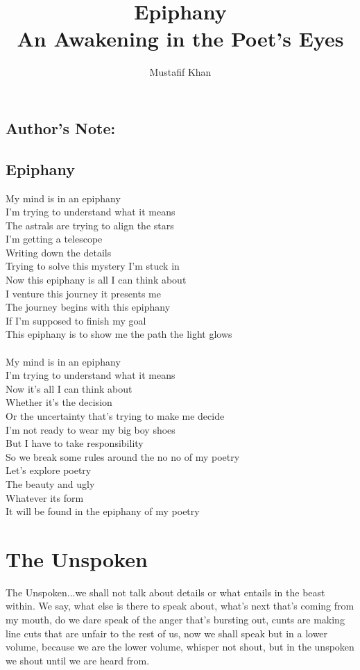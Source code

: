 \documentclass[12pt, b5paper, oneside]{book}
\title{Epiphany\\An Awakening in the Poet's Eyes}
\author{Mustafif Khan}
\date{}
\begin{document}
\maketitle
{}
\newpage
\tableofcontents
\newpage

\section{Author's Note:}
\newpage
\section{Epiphany}
My mind is in an epiphany
\\I'm trying to understand what it means
\\The astrals are trying to align the stars
\\I'm getting a telescope
\\Writing down the details
\\Trying to solve this mystery I'm stuck in
\\Now this epiphany is all I can think about
\\I venture this journey it presents me
\\The journey begins with this epiphany
\\If I'm supposed to finish my goal
\\This epiphany is to show me the path the light glows
%
\\\\My mind is in an epiphany
\\I'm trying to understand what it means
\\Now it's all I can think about
\\Whether it's the decision
\\Or the uncertainty that's trying to make me decide
\\I'm not ready to wear my big boy shoes
\\But I have to take responsibility
\\So we break some rules around the no no of my poetry
\\Let's explore poetry
\\The beauty and ugly
\\Whatever its form
\\It will be found in the epiphany of my poetry 
\newpage
\chapter{The Unspoken}
The Unspoken...we shall not talk about details or what entails in the beast within. 
We say, what else is there to speak about, what's next that's coming from my mouth, do we dare speak of the 
anger that's bursting out, cunts are making line cuts that are unfair to the rest of us, now we shall speak 
but in a lower volume, because we are the lower volume, whisper not shout, but in the unspoken we shout until 
we are heard from.  
\newpage
\end{document}
